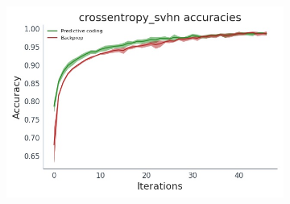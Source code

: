  \begin{figure}
        \centering
        \begin{subfigure}[b]{0.475\textwidth}
            \centering
            \includegraphics[width=\textwidth]{chapter_6_figures/crossentropy_svhn_accuracies_prelim_2.jpg}


\end{subfigure}
\end{figure}
